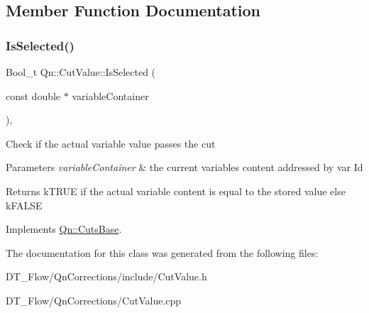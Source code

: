\subsection{Member Function Documentation}
\mbox{\label{classQn_1_1CutValue_acdfa89e7784423f4beaea51deafd424f}} 
\subsubsection{\texorpdfstring{Is\+Selected()}{IsSelected()}}
{\footnotesize\ttfamily Bool\+\_\+t Qn\+::\+Cut\+Value\+::\+Is\+Selected (\begin{DoxyParamCaption}\item[{const double $\ast$}]{variable\+Container }\end{DoxyParamCaption})\hspace{0.3cm}{\ttfamily [inline]}, {\ttfamily [virtual]}}

Check if the actual variable value passes the cut


\begin{DoxyParams}{Parameters}
{\em variable\+Container} & the current variables content addressed by var Id \\
\hline
\end{DoxyParams}
\begin{DoxyReturn}{Returns}
k\+T\+R\+UE if the actual variable content is equal to the stored value else k\+F\+A\+L\+SE 
\end{DoxyReturn}


Implements \mbox{\hyperlink{classQn_1_1CutsBase_aab081fa4220144505ca838539d83aa8d}{Qn\+::\+Cuts\+Base}}.



The documentation for this class was generated from the following files\+:\begin{DoxyCompactItemize}
\item 
D\+T\+\_\+\+Flow/\+Qn\+Corrections/include/Cut\+Value.\+h\item 
D\+T\+\_\+\+Flow/\+Qn\+Corrections/Cut\+Value.\+cpp\end{DoxyCompactItemize}
